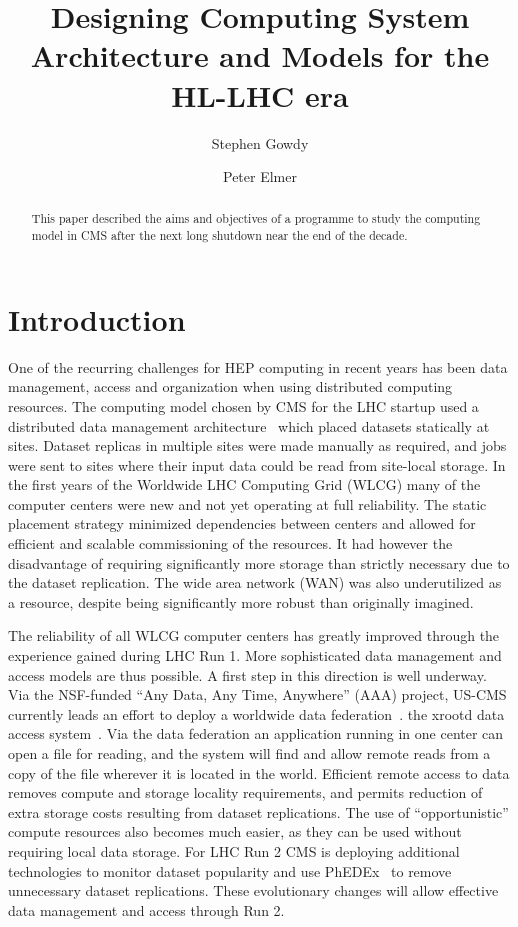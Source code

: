 \documentclass[a4paper]{jpconf}
\begin{document}
\title{Designing Computing System Architecture and Models for the HL-LHC era}

\author{Stephen Gowdy}

\address{Fermilab, Batavia IL, USA}


\author{Peter Elmer}

\address{Princeton, Princeton NJ, USA}


\begin{abstract}
This paper described the aims and objectives of a programme to study
the computing model in CMS after the next long shutdown near the end
of the decade.
\end{abstract}

\section{Introduction}

One of the recurring challenges for HEP computing in recent years
has been data management, access and organization when using
distributed computing resources.  The computing model chosen by CMS
for the LHC startup used a distributed data management
architecture~\cite{CMSCTDR} which placed datasets statically at
sites. Dataset replicas in multiple sites were made manually as
required, and jobs were sent to sites where their input data could
be read from site-local storage.  In the first years of the Worldwide
LHC Computing Grid (WLCG) many of the computer centers were new and
not yet operating at full reliability. The static placement strategy
minimized dependencies between centers and allowed for efficient
and scalable commissioning of the resources.  It had however the
disadvantage of requiring significantly more storage than strictly
necessary due to the dataset replication. The wide area network
(WAN) was also underutilized as a resource, despite being significantly
more robust than originally imagined.

The reliability of all WLCG computer centers has greatly improved
through the experience gained during LHC Run 1. More sophisticated
data management and access models are thus possible. A first step
in this direction is well underway. Via the NSF-funded ``Any Data,
Any Time, Anywhere'' (AAA) project, US-CMS currently leads an effort
to deploy a worldwide data federation~\cite{AAACHEP13}.  %
the xrootd data access system~\cite{XROOTD1}.  Via the data federation
an application running in one center can open a file for reading,
and the system will find and allow remote reads from a copy of the
file wherever it is located in the world. Efficient remote access
to data removes compute and storage locality requirements, and
permits reduction of extra storage costs resulting from dataset
replications.  The use of ``opportunistic'' compute resources also
becomes much easier, as they can be used without requiring local
data storage.  For LHC Run 2 CMS is deploying additional technologies
to monitor dataset popularity and use PhEDEx~\cite{PHEDEX} to remove
unnecessary dataset replications. These evolutionary changes will
allow effective data management and access through Run 2.
\end{document}
